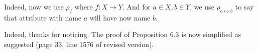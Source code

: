 \answer \TODO
{}


\bigskip

\begin{comment}
	Comparison with $K$-Relations: Your definition of the renaming operator is nonstandard. Usually this operator
	takes a function $f$ that renames the variables of a given relation, i.e., the
	domain of $f$ are the attributes of the relation/expression inside the operator
	and the image are the new (renamed) attributes. You define it the other way
	round. When you use the operator, you mix standard and your non-standard
	definition. Please stay with the established definition.
\end{comment}

\answer Indeed, now we use $\rho_f$ where $f\colon X\to Y$. And for $a\in X, b\in Y$, we use $\rho_{a\mapsto b}$ to say that attribute with name $a$ will have now name $b$.
\bigskip

\begin{comment}
	Comparison with $K$-Relations: The construction of algebra expression from MATLANG expressions is much more
	complicated than necessary. You should not do case distinctions on the types of
	matrices, as the general construction works independently of whether some
	dimension is 1 or not.
\end{comment}

\answer Indeed, thanks for noticing. The proof of Proposition 6.3 is now simplified as suggested (page 33, line 1576 of revised version).
\bigskip

\begin{comment}
	Comparison with $K$-Relations: Just use $Rel(S)(R_V) := \{row, col\}$ for every matrix $V$. row and col encode the domain of the indices of the matrix, as in your construction. The only
	difference is, that this domain could be the singleton $\{1\}$. And you should omit
	the subscripts alpha and beta of row and col. They are not needed, as the domain
	is encoded by the relation. If you omit the subscripts you will not need to
	talk about types at all in most parts of the proof. The soundness of the
	MATLANG expression ensures that the domains of row and col are correct.
	
	To always provide a col attribute you need a new relation $R_1$ with attribute
	col and a single number 1 inside the relation. You can then change $Q(v_p)$ to be
	$$
	\sigma_{row, \gamma_p} (\rho_{\alpha -> \gamma_p}(R_\alpha) \texttt{join} \rho_{\alpha ->
			row}(R_\alpha) \texttt{join} R_1)
	$$
	This construction simplifies the definition for transposition to just
	rename row $\rightarrow$ col and col $\rightarrow$ row. Also for the other operators you only need
	to talk about one case. And types are working flawlessly. E.g. matrix product
	becomes rename col $\rightarrow$ C for the first expression and row $\rightarrow$ C for the second
	expression before doing the join. However you have to explain what the join
	does, i.e., that it just computes the same sum as the matrix product.
\end{comment}

